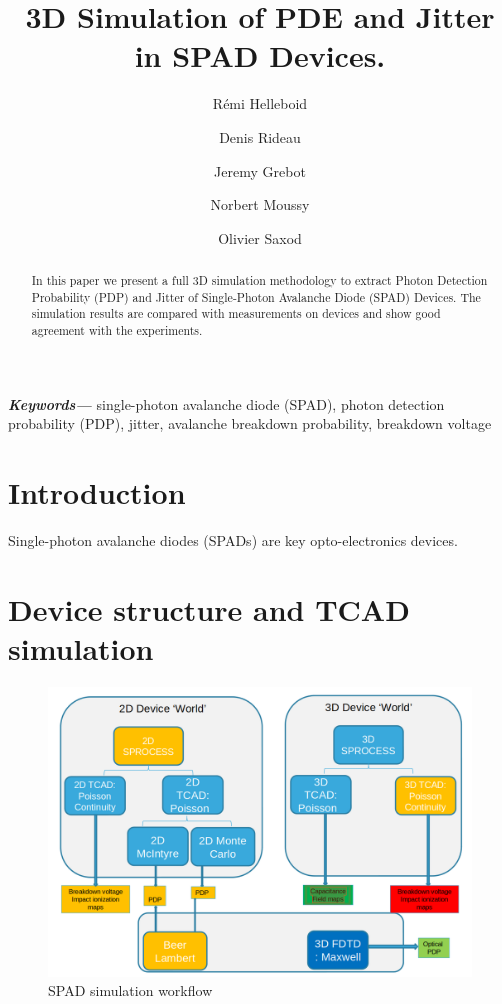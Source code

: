 \documentclass[11pt,a4paper,twocolumn]{article}
\title{3D Simulation of PDE and Jitter in SPAD Devices.}
\author[1]{Rémi Helleboid}
\author[1]{Denis Rideau}
\author[1]{Jeremy Grebot}
\author[2]{Norbert Moussy}
\author[2]{Olivier Saxod}
\affil[1]{ST Microelectronics, Crolles, France}
\affil[2]{CEA LETI, Grenoble, France}
\date{}                     %
\providecommand{\keywords}[1]
{
  \small	
  \textbf{\textit{Keywords---}} #1
}
\begin{document}
\maketitle

\begin{abstract}
In this paper we present a full 3D simulation methodology to extract Photon Detection Probability (PDP) and Jitter of Single-Photon Avalanche Diode (SPAD) Devices. The simulation results are compared with measurements on devices and show good agreement with the experiments.\\
\end{abstract}

\keywords{single-photon avalanche diode (SPAD), photon detection probability (PDP), jitter, avalanche breakdown probability, breakdown voltage}

\section{Introduction}
Single-photon avalanche diodes (SPADs) are key opto-electronics devices.


\section{Device structure and TCAD simulation}
\begin{figure}[hbtp]
\caption{SPAD simulation workflow}
\includegraphics[scale=0.21]{../pictures/TCADWorkflow.png}
\end{figure}
\end{document}
